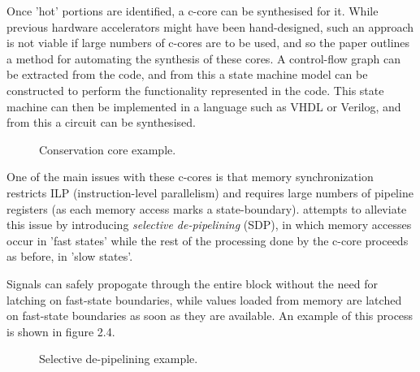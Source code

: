 \documentclass{UoYCSproject}
\begin{document}
Once 'hot' portions are identified, a c-core can be synthesised for it. While previous hardware accelerators
might have been hand-designed, such an approach is not viable if large numbers of c-cores are to be used, and so
the paper outlines a method for automating the synthesis of these cores. A control-flow graph can be extracted
from the code, and from this a state machine model can be constructed to perform the functionality represented
in the code. This state machine can then be implemented in a language such as VHDL or Verilog, and from this a circuit
can be synthesised.

\begin{figure}[h]
\caption{Conservation core example. \cite{c-cores}}
\end{figure}

One of the main issues with these c-cores is that memory synchronization restricts ILP (instruction-level parallelism)
and requires large numbers of pipeline registers (as each memory access marks a state-boundary). \cite{eco-cores} attempts
to alleviate this issue by introducing \textit{selective de-pipelining} (SDP), in which memory accesses occur in 'fast states'
while the rest of the processing done by the c-core proceeds as before, in 'slow states'.

Signals can safely propogate through the entire block without the need for latching on fast-state boundaries,
while values loaded from memory are latched on fast-state boundaries as soon as they are available.
An example of this process is shown in figure 2.4.

\begin{figure}[h]
\caption{Selective de-pipelining example. \cite{eco-cores}}
\end{figure}
\end{document}
